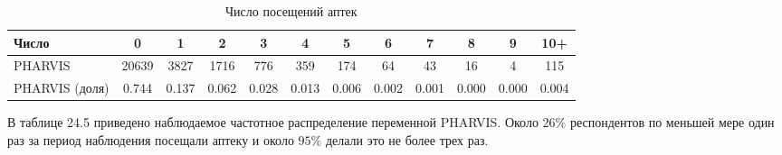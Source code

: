  
\begin{table}
\caption{\label{tab:farmacyvisit} Число посещений аптек}
\begin{center}
\begin{tabular}{lccccccccccc}
\hline
\hline
Число & 0 & 1 & 2 & 3 & 4 & 5 & 6 & 7 & 8 & 9 & 10+ \\
\hline
PHARVIS & 20639 & 3827 & 1716 & 776 & 359 & 174 & 64 & 43 & 16 & 4 & 115 \\
PHARVIS (доля) & 0.744 & 0.137 & 0.062 & 0.028 & 0.013 & 0.006 & 0.002 & 0.001 & 0.000 & 0.000 & 0.004 \\
\hline
\hline
\end{tabular}
\end{center}
\end{table}

В таблице 24.5 приведено наблюдаемое частотное распределение переменной PHARVIS. Около $26\%$ респондентов по меньшей мере один раз за период наблюдения посещали аптеку и около $95\%$ делали это не более трех раз. 


